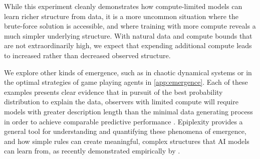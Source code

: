 \documentclass[twoside]{article}
\begin{document}
While this experiment cleanly demonstrates how compute-limited models can learn richer structure from data, it is a more uncommon situation where the brute-force solution is accessible, and where training with more compute reveals a much simpler underlying structure. With natural data and compute bounds that are not extraordinarily high, we expect that expending additional compute leads to increased rather than decreased observed structure. %

%

We explore other kinds of emergence, such as in chaotic dynamical systems or in the optimal strategies of game playing agents in \autoref{app:emergence}. Each of these examples presents clear evidence that in pursuit of the best probability distribution to explain the data, observers with limited compute will require models with greater description length than the minimal data generating process in order to achieve comparable predictive performance \citep{martinez2006phenomenology,redeker2010language}. Epiplexity provides a general tool for understanding and quantifying these phenomena of emergence, and how simple rules can create meaningful, complex structures that AI models can learn from, as recently demonstrated empirically by \citet{zhang2024intelligence}.
%


%

%

%

%

%
%

%

%



%
%
%

%


%

%
%
%


%

%

%
%
%

%




%
%
%
%
%
%

%

%





%
%
%
%
%
%
%
%
%
        
%
%

%
%
%
%
%
%
%
%
%
%

%
%
%
%
%

%
%
%
%

%
%
%
%
%
%
%
%
%
%
%
%
%
%
%
%
%
%
\end{document}
